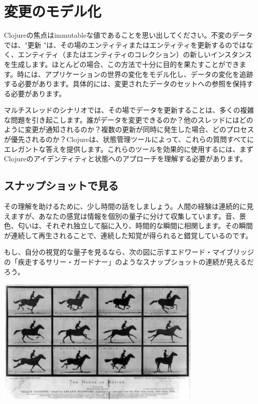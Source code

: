\section{変更のモデル化}

Clojureの焦点はimmutableな値であることを思い出してください。不変のデータでは、"更新 "は、その場のエンティティまたはエンティティを更新するのではなく、エンティティ（またはエンティティのコレクション）の新しいインスタンスを生成します。ほとんどの場合、この方法で十分に目的を果たすことができます。時には、アプリケーションの世界の変化をモデル化し、データの変化を追跡する必要があります。具体的には、変更されたデータのセットへの参照を保持する必要があります。

マルチスレッドのシナリオでは、その場でデータを更新することは、多くの複雑な問題を引き起こします。誰がデータを変更できるのか？他のスレッドにはどのように変更が通知されるのか？複数の更新が同時に発生した場合、どのプロセスが優先されるのか？Clojureは、状態管理ツールによって、これらの質問すべてにエレガントな答えを提供します。これらのツールを効果的に使用するには、まずClojureのアイデンティティと状態へのアプローチを理解する必要があります。

\subsection{スナップショットで見る}

その理解を助けるために、少し時間の話をしましょう。人間の経験は連続的に見えますが、あなたの感覚は情報を個別の量子に分けて収集しています。音、景色、匂いは、それぞれ独立して脳に入り、時間的な瞬間に相関します。その瞬間が連続して再生されることで、連続した知覚が得られると錯覚しているのです。

もし、自分の視覚的な量子を見るなら、次の図に示すエドワード・マイブリッジの「疾走するサリー・ガードナー」のようなスナップショットの連続が見えるだろう。

\includegraphics[width=10cm]{fig_04_001.eps}


